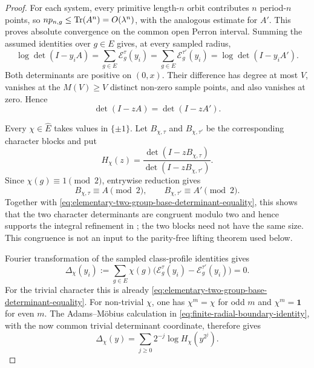 \begin{proof}
For each system, every primitive length-\(n\) orbit contributes \(n\)
period-\(n\) points, so \(np_{n,g}\le\operatorname{Tr}(A^n)=O(\lambda^n)\), with the
analogous estimate for \(A'\).  This proves absolute convergence on the
common open Perron interval.  Summing the assumed identities over \(g\in E\)
gives, at every sampled radius,
\[
 \log\det(I-y_iA)=\sum_{g\in E}\mathcal E_g^\tau(y_i)
 =\sum_{g\in E}\mathcal E_g^{\tau'}(y_i)
 =\log\det(I-y_iA').
\]
Both determinants are positive on \((0,x)\).  Their difference has degree at
most \(V\), vanishes at the \(M(V)\ge V\) distinct non-zero sample points,
and also vanishes at zero.  Hence
\begin{equation}\label{eq:elementary-two-group-base-determinant-equality}
 \det(I-zA)=\det(I-zA').
\end{equation}

Every \(\chi\in\widehat E\) takes values in \(\{\pm1\}\).  Let
\(B_{\chi,\tau}\) and \(B_{\chi,\tau'}\) be the corresponding character
blocks and put
\[
 H_\chi(z)=\frac{\det(I-zB_{\chi,\tau})}
                  {\det(I-zB_{\chi,\tau'})}.
\]
Since \(\chi(g)\equiv1\pmod2\), entrywise reduction gives
\[
 B_{\chi,\tau}\equiv A\pmod2,
 \qquad B_{\chi,\tau'}\equiv A'\pmod2.
\]
Together with \eqref{eq:elementary-two-group-base-determinant-equality}, this
shows that the two character determinants are congruent modulo two and hence
supports the integral refinement in
; the two blocks need not have the same
size.  This congruence is not an input to the parity-free lifting
theorem  used below.

Fourier transformation of the sampled class-profile identities gives
\[
 \Delta_\chi(y_i):=
 \sum_{g\in E}\chi(g)
 \bigl(\mathcal E_g^\tau(y_i)-\mathcal E_g^{\tau'}(y_i)\bigr)=0.
\]
For the trivial character this is already
\eqref{eq:elementary-two-group-base-determinant-equality}.  For non-trivial
\(\chi\), one has \(\chi^m=\chi\) for odd \(m\) and
\(\chi^m=\mathbf1\) for even \(m\).  The Adams--M\"obius calculation in
\eqref{eq:finite-radial-boundary-identity}, with the now common trivial
determinant coordinate, therefore gives
\[
 \Delta_\chi(y)=\sum_{j\ge0}2^{-j}\log H_\chi(y^{2^j}).
\]


\end{proof}
